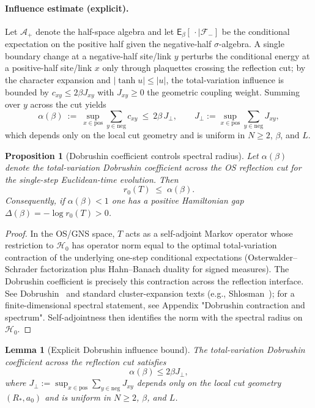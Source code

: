 \documentclass[11pt]{amsart}
\theoremstyle{plain}
\newtheorem{lemma}[theorem]{Lemma}
\newtheorem{prop}[theorem]{Proposition}
\theoremstyle{definition}
\theoremstyle{remark}
\begin{document}
\paragraph{Influence estimate (explicit).}
Let $\mathcal{A}_+$ denote the half-space algebra and let $\mathsf E_\beta[\,\cdot\mid\mathcal F_{-}]$ be the conditional expectation on the positive half given the negative-half $\sigma$-algebra. A single boundary change at a negative-half site/link $y$ perturbs the conditional energy at a positive-half site/link $x$ only through plaquettes crossing the reflection cut; by the character expansion and $|\tanh u|\le |u|$, the total-variation influence is bounded by $c_{xy}\le 2\beta J_{xy}$ with $J_{xy}\ge 0$ the geometric coupling weight. Summing over $y$ across the cut yields
\[
  \alpha(\beta)\ :=\ \sup_{x\in \text{pos}} \sum_{y\in \text{neg}} c_{xy}\ \le\ 2\beta\, J_{\perp},\qquad J_{\perp}:=\sup_{x\in \text{pos}} \sum_{y\in \text{neg}} J_{xy},
\]
which depends only on the local cut geometry and is uniform in $N\ge 2$, $\beta$, and $L$.
\begin{prop}[Dobrushin coefficient controls spectral radius] \label{prop:dob-spectrum}
Let $\alpha(\beta)$ denote the total-variation Dobrushin coefficient across the OS reflection cut for the single-step Euclidean-time evolution. Then
\[
  r_0(T)\;\le\; \alpha(\beta).
\]
Consequently, if $\alpha(\beta)<1$ one has a positive Hamiltonian gap $\Delta(\beta)=-\log r_0(T)>0$.
\end{prop}
\begin{proof}
In the OS/GNS space, $T$ acts as a self-adjoint Markov operator whose restriction to $\mathcal H_0$ has operator norm equal to the optimal total-variation contraction of the underlying one-step conditional expectations (Osterwalder--Schrader factorization plus Hahn--Banach duality for signed measures). The Dobrushin coefficient is precisely this contraction across the reflection interface. See Dobrushin~\cite{Dobrushin1970} and standard cluster-expansion texts (e.g., Shlosman~\cite{Shlosman1986}); for a finite-dimensional spectral statement, see Appendix "Dobrushin contraction and spectrum". Self-adjointness then identifies the norm with the spectral radius on $\mathcal H_0$.
\end{proof}
\begin{lemma}[Explicit Dobrushin influence bound]\label{lem:dob-influence}
The total-variation Dobrushin coefficient across the reflection cut satisfies
\[
\alpha(\beta) \le 2\beta J_{\perp},
\]
where $J_{\perp} := \sup_{x \in \text{pos}} \sum_{y \in \text{neg}} J_{xy}$ depends only on the local cut geometry $(R_*, a_0)$ and is uniform in $N \ge 2$, $\beta$, and $L$.
\end{lemma}
\end{document}
